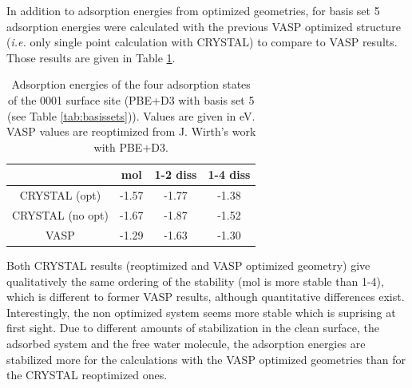 \documentclass[11pt,DIV=13,BCOR=5mm,a4paper,headinclude]{scrbook}
\begin{document}
In addition to adsorption energies from optimized geometries, for basis set 5 adsorption energies were calculated with the previous VASP optimized structure (\textit{i.e.} only single point calculation with CRYSTAL) to compare to VASP results.
Those results are given in Table \ref{tab:pbe-vasp-geom}.
\begin{table}[!h]
  \centering
   \caption{Adsorption energies of the four adsorption states of the 0001 surface site (PBE+D3 with basis set 5 (see Table \ref{tab:basissets})).
Values are given in eV.
VASP values are reoptimized from J. Wirth's work with PBE+D3.}
  \begin{tabular}{cccc}%
  \toprule
   &mol & 1-2 diss & 1-4 diss\\\midrule %
CRYSTAL (opt) & -1.57 & -1.77 &-1.38 \\%
   CRYSTAL (no opt)&-1.67 &-1.87 &-1.52\\%
  VASP &-1.29 &-1.63 &-1.30 \\%
  \bottomrule
  \end{tabular}
  \label{tab:pbe-vasp-geom}
\end{table}
Both CRYSTAL results (reoptimized and VASP optimized geometry) give qualitatively the same ordering of the stability (mol is more stable than 1-4), which is different to former VASP results, although quantitative differences exist.
Interestingly, the non optimized system seems more stable which is suprising at first sight.
Due to different amounts of stabilization in the clean surface, the adsorbed system and the free water molecule, the adsorption energies are stabilized more for the calculations with the VASP optimized geometries than for the CRYSTAL reoptimized ones.
\\\\
\end{document}
